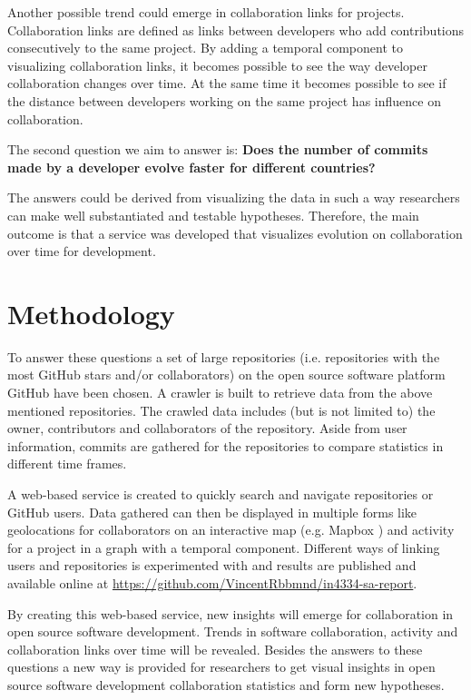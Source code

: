 \documentclass[acmtog, authorversion]{acmart}
\begin{document}
Another possible trend could emerge in collaboration links for projects.
Collaboration links are defined as links between developers who add contributions consecutively to the same project.
By adding a temporal component to visualizing collaboration links, it becomes possible to see the way developer collaboration changes over time.
At the same time it becomes possible to see if the distance between developers working on the same project has influence on collaboration.

The second question we aim to answer is: \textbf{Does the number of commits made by a developer evolve faster for different countries?}

The answers could be derived from visualizing the data in such a way researchers can make well substantiated and testable hypotheses. 
Therefore, the main outcome is that a service was developed that visualizes evolution on collaboration over time for development.

\section{Methodology}
To answer these questions a set of large repositories (i.e. repositories with the most GitHub stars and/or collaborators) on the open source software platform GitHub have been chosen.
A crawler is built to retrieve data from the above mentioned repositories.
The crawled data includes (but is not limited to) the owner, contributors and collaborators of the repository.
Aside from user information, commits are gathered for the repositories to compare statistics in different time frames.

A web-based service is created to quickly search and navigate repositories or GitHub users.
Data gathered can then be displayed in multiple forms like geolocations for collaborators on an interactive map (e.g. Mapbox \cite{MapBox}) and activity for a project in a graph with a temporal component.
Different ways of linking users and repositories is experimented with and results are published and available online at \url{https://github.com/VincentRbbmnd/in4334-sa-report}.

By creating this web-based service, new insights will emerge for collaboration in open source software development.
Trends in software collaboration, activity and collaboration links over time will be revealed.
Besides the answers to these questions a new way is provided for researchers to get visual insights in open source software development collaboration statistics and form new hypotheses.
\end{document}

